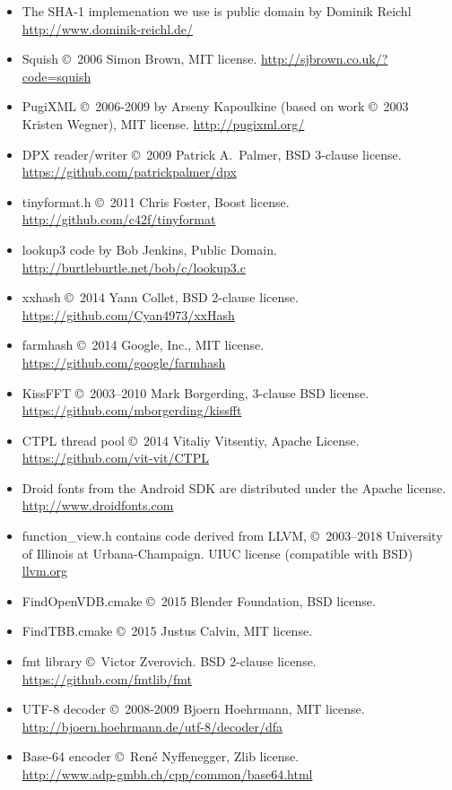 \begin{itemize}
\item The SHA-1 implemenation we use is public domain by
Dominik Reichl \\ \url{http://www.dominik-reichl.de/}
\item Squish \copyright\ 2006 Simon Brown, MIT license.
\url{http://sjbrown.co.uk/?code=squish}
\item PugiXML \copyright\ 2006-2009 by Arseny Kapoulkine (based on work
\copyright\ 2003 Kristen Wegner), MIT license. \url{http://pugixml.org/}
\item DPX reader/writer \copyright\ 2009 Patrick A.\ Palmer, BSD 3-clause license.
  \\ \url{https://github.com/patrickpalmer/dpx}
\item {\cf tinyformat.h} \copyright\ 2011 Chris Foster, Boost license. \\
  \url{http://github.com/c42f/tinyformat}
\item {\cf lookup3} code by Bob Jenkins, Public Domain. \\
\url{http://burtleburtle.net/bob/c/lookup3.c}
\item {\cf xxhash} \copyright\ 2014 Yann Collet, BSD 2-clause license. \\
\url{https://github.com/Cyan4973/xxHash}
\item {\cf farmhash} \copyright\ 2014 Google, Inc., MIT license.
\url{https://github.com/google/farmhash}
\item {\cf KissFFT} \copyright\ 2003--2010 Mark Borgerding, 3-clause BSD license.
  \\ \url{https://github.com/mborgerding/kissfft}
\item {\cf CTPL} thread pool \copyright\ 2014 Vitaliy Vitsentiy, Apache License.
  \\ \url{https://github.com/vit-vit/CTPL}
\item Droid fonts from the Android SDK are distributed under the
    Apache license. \\ \url{http://www.droidfonts.com}
\item {\cf function_view.h} contains code derived from LLVM,
  \copyright\ 2003--2018 University of Illinois at Urbana-Champaign.
  UIUC license (compatible with BSD) \\ \url{llvm.org}
\item {\cf FindOpenVDB.cmake} \copyright\ 2015 Blender Foundation, BSD license.
\item {\cf FindTBB.cmake} \copyright\ 2015 Justus Calvin, MIT license.
\item {\cf fmt} library \copyright\ Victor Zverovich. BSD 2-clause license. \\
    \url{https://github.com/fmtlib/fmt}
\item UTF-8 decoder \copyright\ 2008-2009 Bjoern Hoehrmann, MIT license.
   \url{http://bjoern.hoehrmann.de/utf-8/decoder/dfa} \\
\item Base-64 encoder \copyright\ René Nyffenegger, Zlib license. \\
    \url{http://www.adp-gmbh.ch/cpp/common/base64.html}
\end{itemize}

